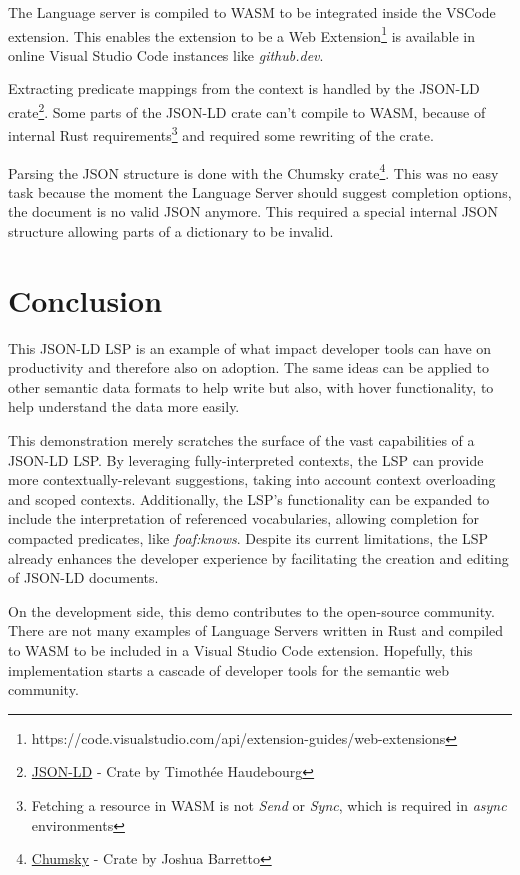 \documentclass[
]{ceurart}
\begin{document}
The Language server is compiled to WASM to be integrated inside the VSCode extension.
This enables the extension to be a Web Extension\footnote{https://code.visualstudio.com/api/extension-guides/web-extensions} is available in online Visual Studio Code instances like \textit{github.dev}.

Extracting predicate mappings from the context is handled by the JSON-LD crate\footnote{\href{https://crates.io/crates/json-ld}{JSON-LD} - Crate by Timothée Haudebourg}.
Some parts of the JSON-LD crate can't compile to WASM, because of internal Rust requirements\footnote{Fetching a resource in WASM is not \textit{Send} or \textit{Sync}, which is required in \textit{async} environments} and required some rewriting of the crate. 

Parsing the JSON structure is done with the Chumsky crate\footnote{\href{https://github.com/zesterer/chumsky}{Chumsky} - Crate by Joshua Barretto}.
This was no easy task because the moment the Language Server should suggest completion options, the document is no valid JSON anymore. 
This required a special internal JSON structure allowing parts of a dictionary to be invalid.


\section{Conclusion}

This JSON-LD LSP is an example of what impact developer tools can have on productivity and therefore also on adoption.
The same ideas can be applied to other semantic data formats to help write but also, with hover functionality, to help understand the data more easily. 

This demonstration merely scratches the surface of the vast capabilities of a JSON-LD LSP.
By leveraging fully-interpreted contexts, the LSP can provide more contextually-relevant suggestions, taking into account context overloading and scoped contexts. 
Additionally, the LSP's functionality can be expanded to include the interpretation of referenced vocabularies, allowing completion for compacted predicates, like \textit{foaf:knows}.
Despite its current limitations, the LSP already enhances the developer experience by facilitating the creation and editing of JSON-LD documents.

On the development side, this demo contributes to the open-source community. 
There are not many examples of Language Servers written in Rust and compiled to WASM to be included in a Visual Studio Code extension.
Hopefully, this implementation starts a cascade of developer tools for the semantic web community.



\end{document}
